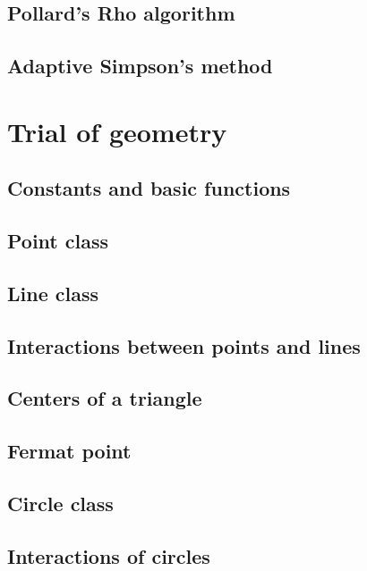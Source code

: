 \documentclass[UTF8,a4paper]{report}
\begin{document}
		\section{Pollard's Rho algorithm}
			
		\section{Adaptive Simpson's method}
			
	\chapter{Trial of geometry}
		\section{Constants and basic functions}
			
		\section{Point class}
			
		\section{Line class}
			
		\section{Interactions between points and lines}
			
		\section{Centers of a triangle}
			
		\section{Fermat point}
			
		\section{Circle class}
			
		\section{Interactions of circles}
			
\end{document}
